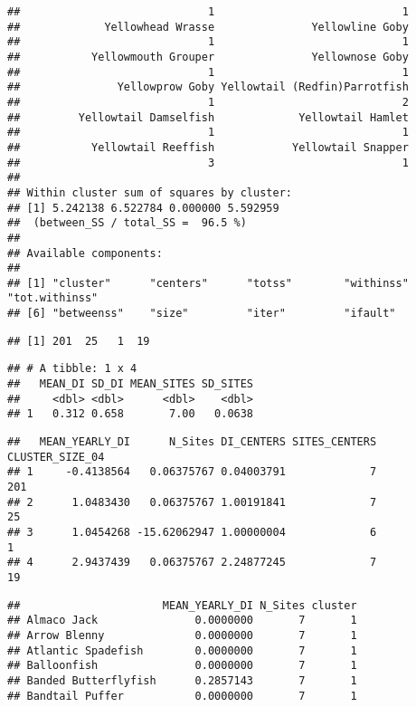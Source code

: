 \documentclass[
]{article}
\begin{document}
\begin{verbatim}
##                             1                             1 
##             Yellowhead Wrasse               Yellowline Goby 
##                             1                             1 
##           Yellowmouth Grouper               Yellownose Goby 
##                             1                             1 
##               Yellowprow Goby Yellowtail (Redfin)Parrotfish 
##                             1                             2 
##         Yellowtail Damselfish             Yellowtail Hamlet 
##                             1                             1 
##           Yellowtail Reeffish            Yellowtail Snapper 
##                             3                             1 
## 
## Within cluster sum of squares by cluster:
## [1] 5.242138 6.522784 0.000000 5.592959
##  (between_SS / total_SS =  96.5 %)
## 
## Available components:
## 
## [1] "cluster"      "centers"      "totss"        "withinss"     "tot.withinss"
## [6] "betweenss"    "size"         "iter"         "ifault"
\end{verbatim}

\begin{verbatim}
## [1] 201  25   1  19
\end{verbatim}

\begin{verbatim}
## # A tibble: 1 x 4
##   MEAN_DI SD_DI MEAN_SITES SD_SITES
##     <dbl> <dbl>      <dbl>    <dbl>
## 1   0.312 0.658       7.00   0.0638
\end{verbatim}

\begin{verbatim}
##   MEAN_YEARLY_DI      N_Sites DI_CENTERS SITES_CENTERS CLUSTER_SIZE_04
## 1     -0.4138564   0.06375767 0.04003791             7             201
## 2      1.0483430   0.06375767 1.00191841             7              25
## 3      1.0454268 -15.62062947 1.00000004             6               1
## 4      2.9437439   0.06375767 2.24877245             7              19
\end{verbatim}

\begin{verbatim}
##                      MEAN_YEARLY_DI N_Sites cluster
## Almaco Jack               0.0000000       7       1
## Arrow Blenny              0.0000000       7       1
## Atlantic Spadefish        0.0000000       7       1
## Balloonfish               0.0000000       7       1
## Banded Butterflyfish      0.2857143       7       1
## Bandtail Puffer           0.0000000       7       1
\end{verbatim}
\end{document}
